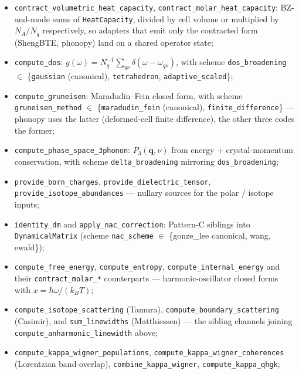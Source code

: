 \documentclass[11pt,a4paper]{article}
\begin{document}
\begin{itemize}[leftmargin=2em, itemsep=0.2em]
        as an ObservableSpace;
  \item \texttt{contract\_volumetric\_heat\_capacity}, \texttt{contract\_molar\_heat\_capacity}:
        BZ-and-mode sums of \texttt{HeatCapacity}, divided by cell volume or
        multiplied by $N_A/N_q$ respectively, so adapters that emit only the
        contracted form (ShengBTE, phonopy) land on a shared operator state;
  \item \texttt{compute\_dos}: $g(\omega) = N_q^{-1} \sum_{q\nu}
        \delta(\omega - \omega_{q\nu})$, with scheme
        \texttt{dos\_broadening} $\in$ \{\texttt{gaussian} (canonical),
        \texttt{tetrahedron}, \texttt{adaptive\_scaled}\};
  \item \texttt{compute\_gruneisen}: Maradudin--Fein closed form, with
        scheme \texttt{gruneisen\_method} $\in$ \{\texttt{maradudin\_fein}
        (canonical), \texttt{finite\_difference}\} --- phonopy uses the
        latter (deformed-cell finite difference), the other three codes the
        former;
  \item \texttt{compute\_phase\_space\_3phonon}: $P_3(\mathbf{q}, \nu)$ from
        energy + crystal-momentum conservation, with scheme
        \texttt{delta\_broadening} mirroring \texttt{dos\_broadening};
  \item \texttt{provide\_born\_charges},
        \texttt{provide\_dielectric\_tensor},
        \texttt{provide\_isotope\_abundances} --- nullary sources for the
        polar / isotope inputs;
  \item \texttt{identity\_dm} and \texttt{apply\_nac\_correction}:
        Pattern-C siblings into \texttt{DynamicalMatrix} (scheme
        \texttt{nac\_scheme} $\in$ \{gonze\_lee canonical,
        wang, ewald\});
  \item \texttt{compute\_free\_energy}, \texttt{compute\_entropy},
        \texttt{compute\_internal\_energy} and their
        \texttt{contract\_molar\_*} counterparts --- harmonic-oscillator
        closed forms with $x = \hbar\omega/(k_B T)$;
  \item \texttt{compute\_isotope\_scattering} (Tamura),
        \texttt{compute\_boundary\_scattering} (Casimir), and
        \texttt{sum\_linewidths} (Matthiessen) --- the sibling channels
        joining \texttt{compute\_anharmonic\_linewidth} above;
  \item \texttt{compute\_kappa\_wigner\_populations},
        \texttt{compute\_kappa\_wigner\_coherences} (Lorentzian
        band-overlap), \texttt{combine\_kappa\_wigner},
        \texttt{compute\_kappa\_qhgk};

\end{itemize}
\end{document}
